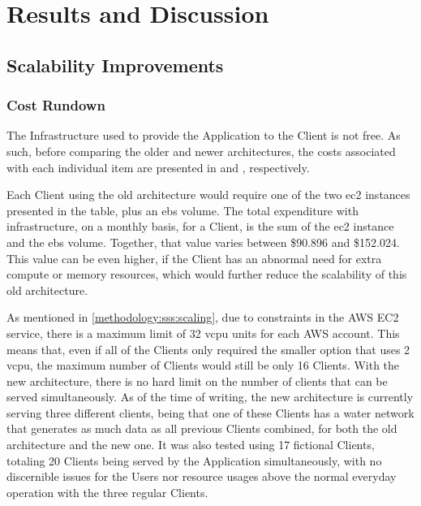 \chapter{Results and Discussion}\label{results-and-discussion}

\section{Scalability Improvements}\label{results-and-discussion:s:scalability-improvements}

\subsection{Cost Rundown}\label{results-and-discussion:ss:cost-rundown}

The Infrastructure used to provide the Application to the Client is not free. As such, before comparing the older and newer architectures, the costs associated with each individual item are presented in  and , respectively. 



Each Client using the old architecture would require one of the two \gls{ec2} instances presented in the  table, plus an \gls{ebs} volume. The total expenditure with infrastructure, on a monthly basis, for a Client, is the sum of the \gls{ec2} instance and the \gls{ebs} volume. Together, that value varies between \$90.896 and \$152.024. This value can be even higher, if the Client has an abnormal need for extra compute or memory resources, which would further reduce the scalability of this old architecture.





As mentioned in \cref{methodology:sss:scaling}, due to constraints in the AWS EC2 service, there is a maximum limit of 32 \gls{vcpu} units for each AWS account. This means that, even if all of the Clients only required the smaller option that uses 2 \gls{vcpu}, the maximum number of Clients would still be only 16 Clients. With the new architecture, there is no hard limit on the number of clients that can be served simultaneously. As of the time of writing, the new architecture is currently serving three different clients, being that one of these Clients has a water network that generates as much data as all previous Clients combined, for both the old architecture and the new one. It was also tested using 17 fictional Clients, totaling 20 Clients being served by the Application simultaneously, with no discernible issues for the Users nor resource usages above the normal everyday operation with the three regular Clients.

